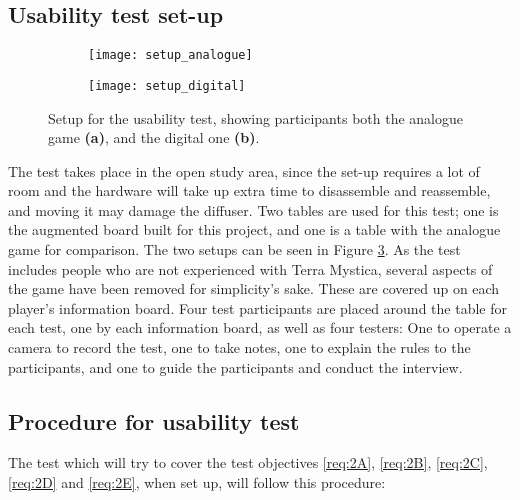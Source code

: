 \subsection{Usability test set-up}
\begin{figure}[!h]
	\centering
	\begin{subfigure}[b]{0.4\textwidth}
	\texttt{[image: setup\_analogue]}
		\caption{\label{Fig:SetupAna}}
	\end{subfigure}
	\begin{subfigure}[b]{0.4\textwidth}
	\texttt{[image: setup\_digital]}
		\caption{\label{Fig:SetupDigi}}
	\end{subfigure}
	\caption{Setup for the usability test, showing participants both the analogue game \textbf{(a)}, and the digital one \textbf{(b)}.\label{Fig:Setup}}
\end{figure}
The test takes place in the open study area, since the set-up requires a lot of room and the hardware will take up extra time to disassemble and reassemble, and moving it may damage the diffuser. Two tables are used for this test; one is the augmented board built for this project, and one is a table with the analogue game for comparison. The two setups can be seen in Figure \ref{Fig:Setup}. As the test includes people who are not experienced with Terra Mystica, several aspects of the game have been removed for simplicity's sake. These are covered up on each player's information board. Four test participants are placed around the table for each test, one by each information board, as well as four testers: One to operate a camera to record the test, one to take notes, one to explain the rules to the participants, and one to guide the participants and conduct the interview.

\subsection{Procedure for usability test}
The test which will try to cover the test objectives \ref{req:2A}, \ref{req:2B}, \ref{req:2C}, \ref{req:2D} and \ref{req:2E}, when set up, will follow this procedure:


